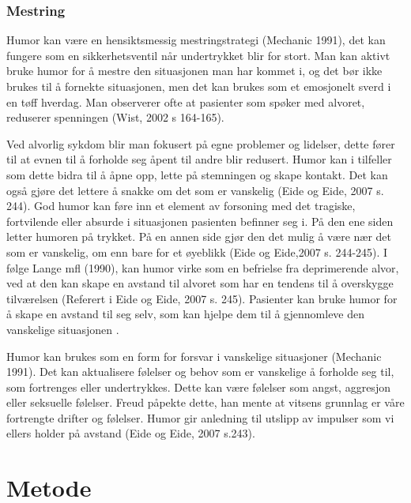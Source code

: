 \subsection{Mestring}

Humor kan være en hensiktsmessig mestringstrategi (Mechanic 1991), det kan
fungere som en sikkerhetsventil når undertrykket blir for stort.  Man kan
aktivt bruke humor for å mestre den situasjonen man har kommet i, og det bør
ikke brukes til å fornekte situasjonen, men det kan brukes som et emosjonelt
sverd i en tøff hverdag. Man observerer ofte at pasienter som spøker med
alvoret, reduserer spenningen (Wist, 2002 s 164-165).

Ved alvorlig sykdom blir man fokusert på egne problemer og lidelser, dette
fører til at evnen til å forholde seg åpent til andre blir redusert. Humor kan
i tilfeller som dette bidra til å åpne opp, lette på stemningen og skape
kontakt. Det kan også gjøre det lettere å snakke om det som er vanskelig (Eide
og Eide, 2007 s. 244). God humor kan føre inn et element av forsoning med det
tragiske, fortvilende eller absurde i situasjonen pasienten befinner seg i. På
den ene siden letter humoren på trykket. På en annen side gjør den det mulig å
være nær det som er vanskelig, om enn bare for et øyeblikk (Eide og Eide,2007
s. 244-245). I følge Lange mfl (1990), kan humor virke som en befrielse fra
deprimerende alvor, ved at den kan skape en avstand til alvoret som har en
tendens til å overskygge tilværelsen (Referert i Eide og Eide, 2007 s. 245).
Pasienter kan bruke humor for å skape en avstand til seg selv, som kan hjelpe
dem til å gjennomleve den vanskelige situasjonen \cite[s.~394]{bjork2011}.

Humor kan brukes som en form for forsvar i vanskelige situasjoner (Mechanic
1991). Det kan aktualisere følelser og behov som er vanskelige å forholde seg
til, som fortrenges eller undertrykkes. Dette kan være følelser som angst,
aggresjon eller seksuelle følelser. Freud påpekte dette, han mente at vitsens
grunnlag er våre fortrengte drifter og følelser. Humor gir anledning til
utslipp av impulser som vi ellers holder på avstand (Eide og Eide, 2007 s.243).

\chapter{Metode}

